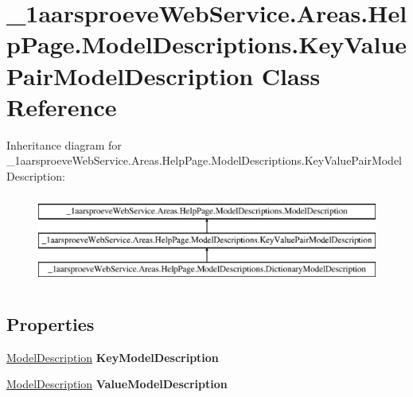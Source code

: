\hypertarget{class__1aarsproeve_web_service_1_1_areas_1_1_help_page_1_1_model_descriptions_1_1_key_value_pair_model_description}{}\section{\+\_\+1aarsproeve\+Web\+Service.\+Areas.\+Help\+Page.\+Model\+Descriptions.\+Key\+Value\+Pair\+Model\+Description Class Reference}
\label{class__1aarsproeve_web_service_1_1_areas_1_1_help_page_1_1_model_descriptions_1_1_key_value_pair_model_description}
Inheritance diagram for \+\_\+1aarsproeve\+Web\+Service.\+Areas.\+Help\+Page.\+Model\+Descriptions.\+Key\+Value\+Pair\+Model\+Description\+:\begin{figure}[H]
\begin{center}
\leavevmode
\includegraphics[height=3.000000cm]{class__1aarsproeve_web_service_1_1_areas_1_1_help_page_1_1_model_descriptions_1_1_key_value_pair_model_description}
\end{center}
\end{figure}
\subsection*{Properties}
\begin{DoxyCompactItemize}
\item 
\hypertarget{class__1aarsproeve_web_service_1_1_areas_1_1_help_page_1_1_model_descriptions_1_1_key_value_pair_model_description_a23fe709521a85919c682b4ab9a011bef}{}\hyperlink{class__1aarsproeve_web_service_1_1_areas_1_1_help_page_1_1_model_descriptions_1_1_model_description}{Model\+Description} {\bfseries Key\+Model\+Description}\label{class__1aarsproeve_web_service_1_1_areas_1_1_help_page_1_1_model_descriptions_1_1_key_value_pair_model_description_a23fe709521a85919c682b4ab9a011bef}

\item 
\hypertarget{class__1aarsproeve_web_service_1_1_areas_1_1_help_page_1_1_model_descriptions_1_1_key_value_pair_model_description_a93b416f7ebe2d8515d8b483d7518ea3b}{}\hyperlink{class__1aarsproeve_web_service_1_1_areas_1_1_help_page_1_1_model_descriptions_1_1_model_description}{Model\+Description} {\bfseries Value\+Model\+Description}\label{class__1aarsproeve_web_service_1_1_areas_1_1_help_page_1_1_model_descriptions_1_1_key_value_pair_model_description_a93b416f7ebe2d8515d8b483d7518ea3b}

\end{DoxyCompactItemize}


